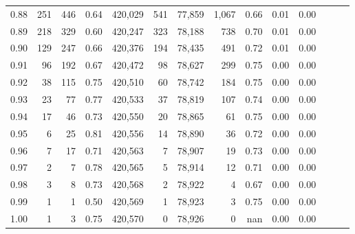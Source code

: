 \begin{tabular}{rrrrrrrrrrrrrr}
0.88 &     251 &    446 &  0.64 &  420,029 &      541 &  77,859 &   1,067 &  0.66 &  0.01 &      0.00 \\
0.89 &     218 &    329 &  0.60 &  420,247 &      323 &  78,188 &     738 &  0.70 &  0.01 &      0.00 \\
0.90 &     129 &    247 &  0.66 &  420,376 &      194 &  78,435 &     491 &  0.72 &  0.01 &      0.00 \\
0.91 &      96 &    192 &  0.67 &  420,472 &       98 &  78,627 &     299 &  0.75 &  0.00 &      0.00 \\
0.92 &      38 &    115 &  0.75 &  420,510 &       60 &  78,742 &     184 &  0.75 &  0.00 &      0.00 \\
0.93 &      23 &     77 &  0.77 &  420,533 &       37 &  78,819 &     107 &  0.74 &  0.00 &      0.00 \\
0.94 &      17 &     46 &  0.73 &  420,550 &       20 &  78,865 &      61 &  0.75 &  0.00 &      0.00 \\
0.95 &       6 &     25 &  0.81 &  420,556 &       14 &  78,890 &      36 &  0.72 &  0.00 &      0.00 \\
0.96 &       7 &     17 &  0.71 &  420,563 &        7 &  78,907 &      19 &  0.73 &  0.00 &      0.00 \\
0.97 &       2 &      7 &  0.78 &  420,565 &        5 &  78,914 &      12 &  0.71 &  0.00 &      0.00 \\
0.98 &       3 &      8 &  0.73 &  420,568 &        2 &  78,922 &       4 &  0.67 &  0.00 &      0.00 \\
0.99 &       1 &      1 &  0.50 &  420,569 &        1 &  78,923 &       3 &  0.75 &  0.00 &      0.00 \\
1.00 &       1 &      3 &  0.75 &  420,570 &        0 &  78,926 &       0 &   nan &  0.00 &      0.00 \\
\bottomrule
\end{tabular}
